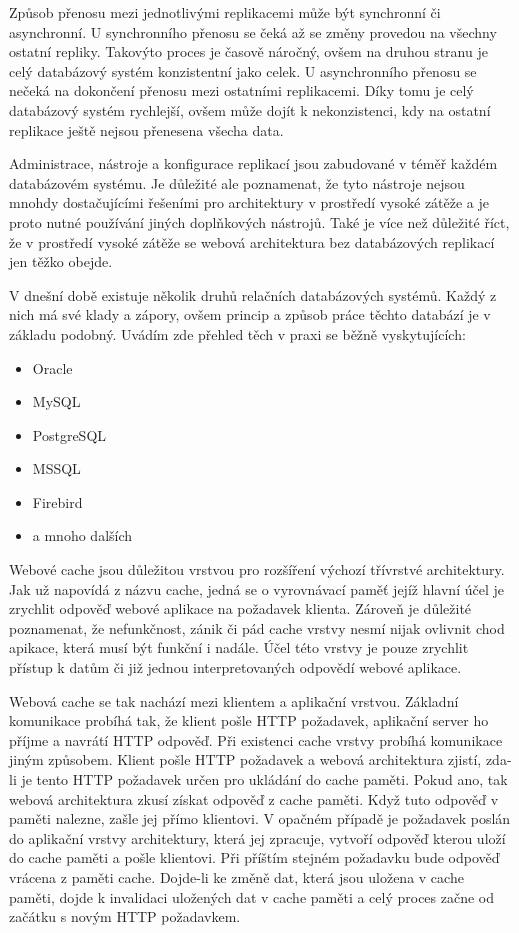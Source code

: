 \documentclass[12pt]{article}
\begin{document}
Způsob přenosu mezi jednotlivými replikacemi může být synchronní či asynchronní. U synchronního přenosu se čeká až se změny provedou na všechny ostatní repliky. Takovýto proces je časově náročný, ovšem na druhou stranu je celý databázový systém konzistentní jako celek. U asynchronního přenosu se nečeká na dokončení přenosu mezi ostatními replikacemi. Díky tomu je celý databázový systém rychlejší, ovšem může dojít k nekonzistenci, kdy na ostatní replikace ještě nejsou přenesena všecha data.

Administrace, nástroje a konfigurace replikací jsou zabudované v téměř každém databázovém systému. Je důležité ale poznamenat, že tyto nástroje nejsou mnohdy dostačujícími řešeními pro architektury v prostředí vysoké zátěže a je proto nutné používání jiných doplňkových nástrojů. Také je více než důležité říct, že v prostředí vysoké zátěže se webová architektura bez databázových replikací jen těžko obejde.\cite{replikace}

V dnešní době existuje několik druhů relačních databázových systémů. Každý z nich má své klady a zápory, ovšem princip a způsob práce těchto databází je v základu podobný. Uvádím zde přehled těch v praxi se běžně vyskytujících:

\begin{itemize}
\item Oracle
\item MySQL
\item PostgreSQL
\item MSSQL
\item Firebird
\item a mnoho dalších
\end{itemize}



Webové cache jsou důležitou vrstvou pro rozšíření výchozí třívrstvé architektury. Jak už napovídá z názvu cache, jedná se o vyrovnávací paměť jejíž hlavní účel je zrychlit odpověď webové aplikace na požadavek klienta. Zároveň je důležité poznamenat, že nefunkčnost, zánik či pád cache vrstvy nesmí nijak ovlivnit chod apikace, která musí být funkční i nadále. Účel této vrstvy je pouze zrychlit přístup k datům či již jednou interpretovaných odpovědí webové aplikace.

Webová cache se tak nachází mezi klientem a aplikační vrstvou. Základní komunikace probíhá tak, že klient pošle HTTP požadavek, aplikační server ho příjme a navrátí HTTP odpověď. Při existenci cache vrstvy probíhá komunikace jiným způsobem. Klient pošle HTTP požadavek a webová architektura zjistí, zda-li je tento HTTP požadavek určen pro ukládání do cache paměti. Pokud ano, tak webová architektura zkusí získat odpověď z cache paměti. Když tuto odpověď v paměti nalezne, zašle jej přímo klientovi. V opačném případě je požadavek poslán do aplikační vrstvy architektury, která jej zpracuje, vytvoří odpověď kterou uloží do cache paměti a pošle klientovi. Při příštím stejném požadavku bude odpověď vrácena z paměti cache. Dojde-li ke změně dat, která jsou uložena v cache paměti, dojde k invalidaci uložených dat v cache paměti a celý proces začne od začátku s novým HTTP požadavkem.
\end{document}
